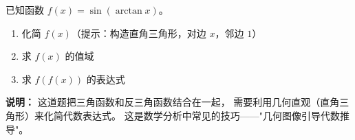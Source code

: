 
\begin{exercise}[7]
已知函数 \(f(x) = \sin(\arctan x)\)。
\begin{enumerate}
  \item[(1)] 化简 \(f(x)\)（提示：构造直角三角形，对边 \(x\)，邻边 \(1\)）
  \item[(2)] 求 \(f(x)\) 的值域
  \item[(3)] 求 \(f(f(x))\) 的表达式
\end{enumerate}

\textbf{说明：} 这道题把三角函数和反三角函数结合在一起，
需要利用几何直观（直角三角形）来化简代数表达式。
这是数学分析中常见的技巧——"几何图像引导代数推导"。
\end{exercise}
